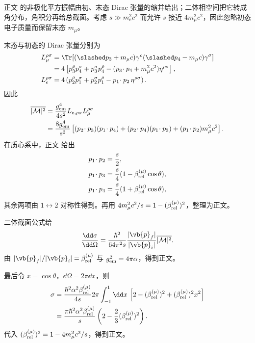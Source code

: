 \begin{derivation}[电子湮灭产生缪子对的总截面]

正文 的非极化平方振幅由初、末态 Dirac 张量的缩并给出；二体相空间把它转成角分布，角积分再给总截面。考虑 $s\gg m_{\mathrm e}^2c^2$ 而允许 $s$ 接近 $4m_\mu^2c^2$，因此忽略初态电子质量而保留末态 $m_\mu$。

末态与初态的 Dirac 张量分别为
\begin{align*}
 L_{\mu}^{\rho\sigma}
 &=\Tr[(\slashed p_3+m_\mu c)\gamma^\rho
 (\slashed p_4-m_\mu c)\gamma^\sigma]\\
 &=4\left[
 p_3^\rho p_4^\sigma+p_3^\sigma p_4^\rho
 -(p_3\!\cdot p_4+m_\mu^2c^2)\eta^{\rho\sigma}
 \right],\\
 L_e^{\rho\sigma}
 &=4\left(
 p_2^\rho p_1^\sigma+p_2^\sigma p_1^\rho
 -p_1\!\cdot p_2\,\eta^{\rho\sigma}
 \right).
\end{align*}
因此
\begin{align*}
 \overline{|\mathcal M|^2}
 &=\frac{g_{\rm em}^4}{4s^2}L_{e,\rho\sigma}L_\mu^{\rho\sigma}\\
 &=\frac{8g_{\rm em}^4}{s^2}
 \left[
 (p_2\!\cdot p_3)(p_1\!\cdot p_4)
 +(p_2\!\cdot p_4)(p_1\!\cdot p_3)
 +(p_1\!\cdot p_2)m_\mu^2c^2
 \right].
\end{align*}
在质心系中，正文 给出
\begin{align*}
 p_1\!\cdot p_2&=\frac{s}{2},\\
 p_1\!\cdot p_3&=\frac{s}{4}
 (1-\beta_{\rm rel}^{(\mu)}\cos\theta),\\
 p_1\!\cdot p_4&=\frac{s}{4}
 (1+\beta_{\rm rel}^{(\mu)}\cos\theta),
\end{align*}
其余两项由 $1\leftrightarrow2$ 对称性得到。再用
$4m_\mu^2c^2/s=1-(\beta_{\rm rel}^{(\mu)})^2$，整理为正文。

二体截面公式给
\begin{equation*}
 \frac{\dd\sigma}{\dd\Omega}
 =\frac{\hbar^2}{64\pi^2s}
 \frac{|\vb{p}_f|}{|\vb{p}_i|}
 \overline{|\mathcal M|^2}.
\end{equation*}
由 $|\vb{p}_f|/|\vb{p}_i|=\beta_{\rm rel}^{(\mu)}$ 与
$g_{\rm em}^2=4\pi\alpha$，得到正文。

最后令 $x=\cos\theta$，$\dd\Omega=2\pi\dd x$，则
\begin{align*}
 \sigma
 &=\frac{\hbar^2\alpha^2\beta_{\rm rel}^{(\mu)}}{4s}
 2\pi\int_{-1}^{1}\dd x\,
 \left[2-(\beta_{\rm rel}^{(\mu)})^2
 +(\beta_{\rm rel}^{(\mu)})^2x^2\right]\\
 &=\frac{\pi\hbar^2\alpha^2\beta_{\rm rel}^{(\mu)}}{s}
 \left(2-\frac{2}{3}(\beta_{\rm rel}^{(\mu)})^2\right).
\end{align*}
代入
$(\beta_{\rm rel}^{(\mu)})^2=1-4m_\mu^2c^2/s$，得到正文。
\end{derivation}

